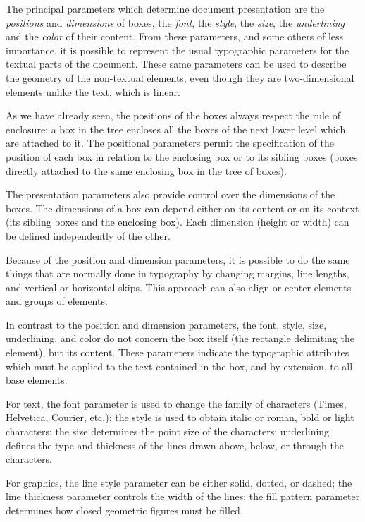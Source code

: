 The principal parameters which determine document presentation are the
{\em positions} and {\em dimensions} of boxes, the {\em font}, the
{\em style}, the {\em size}, the {\em underlining} and the {\em color}
of their content.  From these parameters, and some others of less
importance, it is possible to represent the usual typographic
parameters for the textual parts of the document.  These same
parameters can be used to describe the geometry of the non-textual
elements, even though they are two-dimensional elements unlike the
text, which is linear.

As we have already  seen, the positions of the boxes always respect
the rule of enclosure: a box in the tree encloses all the boxes of the
next lower level which are attached to it.  The positional parameters
permit the specification of the position of each box in relation to
the enclosing box or to its sibling boxes (boxes directly attached to
the same enclosing box in the tree of boxes).

The presentation parameters also provide control over the dimensions
of the boxes.  The dimensions of a box can depend either on its
content or on its context (its sibling boxes and the enclosing box).
Each dimension (height or width) can be defined independently of the
other.

Because of the position and dimension parameters, it is possible to do
the same things that are normally done in typography by changing
margins, line lengths, and vertical or horizontal skips.  This
approach can also align or center elements and groups of elements.

In contrast to the position and dimension parameters, the font, style,
size, underlining, and color do not concern the box itself (the
rectangle delimiting the element), but its content.  These parameters
indicate the typographic attributes which must be applied to the text
contained in the box, and by extension, to all base elements.

For text, the font parameter is used to change the family of
characters (Times, Helvetica, Courier, etc.); the style is used to
obtain italic or roman, bold or light characters;  the size determines
the point size of the characters; underlining defines the type and
thickness of the lines drawn above, below, or through the characters.

For graphics, the line style parameter can be either solid, dotted, or
dashed;  the line thickness parameter controls the width of the lines;
the fill pattern parameter determines how closed geometric figures
must be filled.


